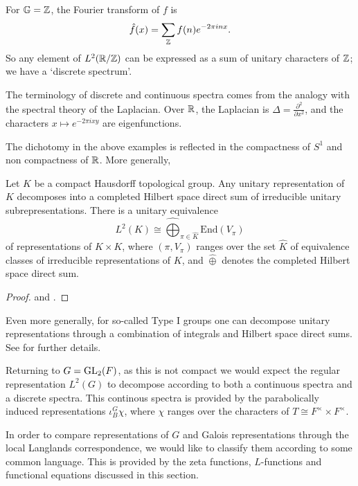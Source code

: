\begin{example}
    For $\mathbb G = \mathbb{Z}$, the Fourier transform of $f$ is 
    $$\hat{f}(x) = \sum_{\mathbb{Z}} f(n)e^{-2\pi i nx}.$$
    So any element of $L^2(\mathbb{R}/\mathbb{Z})$ can be expressed as a sum of unitary characters of $\mathbb{Z}$; we have a `discrete spectrum'. 
\end{example}

\begin{rem}
    The terminology of discrete and continuous spectra comes from the analogy with the spectral theory of the Laplacian. Over $\mathbb{R}$, the Laplacian is $\Delta = \frac{\partial^2}{\partial x^2}$, and the characters $x \mapsto e^{-2\pi i xy}$ are eigenfunctions. 
\end{rem}

The dichotomy in the above examples is reflected in the compactness of $S^1$ and non compactness of $\mathbb{R}$. More generally,

\begin{thm}
    Let $K$ be a compact Hausdorff topological group. Any unitary representation of $K$ decomposes into a completed Hilbert space direct sum of irreducible unitary subrepresentations. There is a unitary equivalence
    $$L^2(K) \cong \widehat{\bigoplus}_{\pi \in \hat{K}} \mathrm{End}(V_\pi)$$
    of representations of $K\times K$, where $(\pi,V_\pi)$ ranges over the set $\hat{K}$ of equivalence classes of irreducible representations of $K$, and $\hat\oplus$ denotes the completed Hilbert space direct sum.
\end{thm}
\begin{proof}
    \cite[Theorem 7.3.2]{DE} and \cite[Theorem 7.2.3]{DE}.
\end{proof}

Even more generally, for so-called Type I groups one can decompose unitary representations through a combination of integrals and Hilbert space direct sums. See \cite[Section 3.10]{GH1} for further details.

Returning to $G=\mathrm{GL}_2(F)$, as this is not compact we would expect the regular representation $L^2(G)$ to decompose according to both a continuous spectra and a discrete spectra. This continous spectra is provided by the parabolically induced representations $\iota_B^G \chi$, where $\chi$ ranges over the characters of $T \cong F^\times \times F^\times$.

In order to compare representations of $G$ and Galois representations through the local Langlands correspondence, we would like to classify them according to some common language. This is provided by the zeta functions, $L$-functions and functional equations discussed in this section. 

